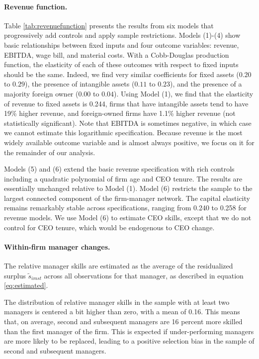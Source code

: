 \documentclass[11pt,a4paper]{article}
\begin{document}
\paragraph{Revenue function.}
Table \ref{tab:revenuefunction} presents the results from six models that progressively add controls and apply sample restrictions. Models (1)-(4) show basic relationships between fixed inputs and four outcome variables: revenue, EBITDA, wage bill, and material costs. With a Cobb-Douglas production function, the elasticity of each of these outcomes with respect to fixed inputs should be the same. Indeed, we find very similar coefficients for fixed assets ($0.20$ to $0.29$), the presence of intangible assets ($0.11$ to $0.23$), and the presence of a majority foreign owner ($0.00$ to $0.04$). Using Model (1), we find that the elasticity of revenue to fixed assets is 0.244, firms that have intangible assets tend to have 19\% higher revenue, and foreign-owned firms have 1.1\% higher revenue (not statistically significant). Note that EBITDA is sometimes negative, in which case we cannot estimate this logarithmic specification. Because revenue is the most widely available outcome variable and is almost always positive, we focus on it for the remainder of our analysis.

Models (5) and (6) extend the basic revenue specification with rich controls including a quadratic polynomial of firm age and CEO tenure. The results are essentially unchanged relative to Model (1). Model (6) restricts the sample to the largest connected component of the firm-manager network. The capital elasticity remains remarkably stable across specifications, ranging from 0.240 to 0.258 for revenue models. We use Model (6) to estimate CEO skills, except that we do not control for CEO tenure, which would be endogenous to CEO change.



\paragraph{Within-firm manager changes.}




The relative manager skills are estimated as the average of the residualized surplus $\tilde s_{imst}$ across all observations for that manager, as described in equation \eqref{eq:estimated}. 

The distribution of relative manager skills in the sample with at least two managers is centered a bit higher than zero, with a mean of 0.16. This means that, on average, second and subsequent managers are 16 percent more skilled than the first manager of the firm. This is expected if under-performing managers are more likely to be replaced, leading to a positive selection bias in the sample of second and subsequent managers. 
\end{document}
